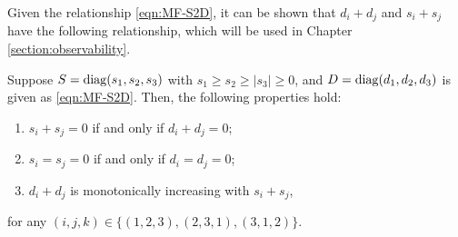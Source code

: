 Given the relationship \eqref{eqn:MF-S2D}, it can be shown that $d_i+d_j$ and $s_i+s_j$ have the following relationship, which will be used in Chapter \ref{section:observability}.
\begin{lemma} \label{lemma:MF-SD}
	Suppose $S = \mathrm{diag}(s_1,s_2,s_3)$ with $s_1\geq s_2 \geq |s_3|\geq 0$, and $D = \mathrm{diag}(d_1,d_2,d_3)$ is given as \eqref{eqn:MF-S2D}.
	Then, the following properties hold:
	\begin{enumerate}
		\item $s_i+s_j=0$ if and only if $d_i+d_j=0$; 
		\item $s_i=s_j=0$ if and only if $d_i=d_j=0$;
		\item $d_i+d_j$ is monotonically increasing with $s_i+s_j$, 
	\end{enumerate}
	for any $(i,j,k)\in\{(1,2,3),(2,3,1),(3,1,2)\}$.
\end{lemma}

